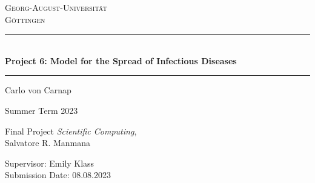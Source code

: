 \begin{titlepage}
    \centering
    \vspace*{0.5cm}
    \LARGE{\textsc{Georg-August-Universität} \\
    \textsc{Göttingen}}
    \vspace*{1.7cm}
    
    \rule{\textwidth}{1pt}\\[0.5cm]
    {\huge \bfseries
      Project 6: Model for the Spread of Infectious Diseases}\\
    \rule{\textwidth}{1pt}
    
    \vspace*{2.7cm}
    
    {\large Carlo von Carnap\\
    
    \vspace*{0.7cm}

    Summer Term 2023}
    
    \vspace*{5.7cm}

    {\large Final Project \textit{Scientific Computing}, \\
    Salvatore R. Manmana

    \vspace*{0.7cm}
    
    Supervisor: Emily Klass \\
    Submission Date: 08.08.2023}

    \end{titlepage}
